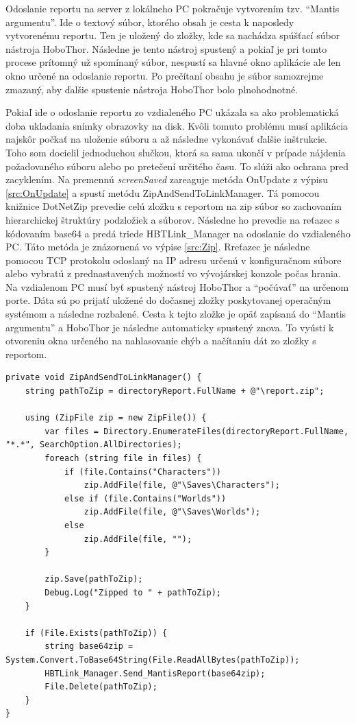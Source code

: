 \documentclass[slovak, bachelorpractice]{diploma}
\begin{document}
Odoslanie reportu na server z lokálneho PC pokračuje vytvorením tzv. \enquote{Mantis argumentu}. Ide o textový súbor, ktorého obsah je cesta k naposledy vytvorenému reportu. Ten je uložený do zložky, kde sa nachádza spúšťací súbor nástroja HoboThor. Následne je tento nástroj spustený a pokiaľ je pri tomto procese  prítomný už spomínaný súbor, nespustí sa hlavné okno aplikácie ale len okno určené na odoslanie reportu. Po prečítaní obsahu je súbor samozrejme zmazaný, aby ďalšie spustenie nástroja HoboThor bolo plnohodnotné.

Pokiaľ ide o odoslanie reportu zo vzdialeného PC ukázala sa ako problematická doba ukladania snímky obrazovky na disk. Kvôli tomuto problému musí aplikácia najskôr počkať na uloženie súboru a až následne vykonávať ďalšie inštrukcie. Toho som docielil jednoduchou slučkou, ktorá sa sama ukončí v prípade nájdenia požadovaného súboru alebo po pretečení určitého času. To slúži ako ochrana pred zacyklením. Na premennú \textit{screenSaved} zareaguje metóda OnUpdate z výpisu \ref{src:OnUpdate} a spustí metódu ZipAndSendToLinkManager. Tá pomocou knižnice DotNetZip \cite{DotNetZip} prevedie celú zložku s reportom na zip súbor so zachovaním hierarchickej štruktúry podzložiek a súborov. Následne ho prevedie na reťazec s kódovaním base64 a predá triede HBTLink\_Manager na odoslanie do vzdialeného PC. Táto metóda je znázornená vo výpise \ref{src:Zip}. Rreťazec je následne pomocou TCP protokolu odoslaný na IP adresu určenú v konfiguračnom súbore alebo vybratú z prednastavených možností vo vývojárskej konzole počas hrania. Na vzdialenom PC musí byť spustený nástroj HoboThor a \enquote{počúvať} na určenom porte. Dáta sú po prijatí uložené do dočasnej zložky poskytovanej operačným systémom a následne rozbalené. Cesta k tejto zložke je opäť zapísaná do \enquote{Mantis argumentu} a HoboThor je následne automaticky spustený znova. To vyústi k otvoreniu okna určeného na nahlasovanie chýb a načítaniu dát zo zložky s reportom.
\vspace{20pt}
\begin{lstlisting}[label=src:Zip,caption={Metóda ZipAndSendToLinkManager triedy ReportingManager}]
private void ZipAndSendToLinkManager() {
    string pathToZip = directoryReport.FullName + @"\report.zip";

    using (ZipFile zip = new ZipFile()) {
        var files = Directory.EnumerateFiles(directoryReport.FullName, "*.*", SearchOption.AllDirectories);
        foreach (string file in files) {
            if (file.Contains("Characters"))
                zip.AddFile(file, @"\Saves\Characters");
            else if (file.Contains("Worlds"))
                zip.AddFile(file, @"\Saves\Worlds");
            else
                zip.AddFile(file, "");
        }

        zip.Save(pathToZip);
        Debug.Log("Zipped to " + pathToZip);
    }

    if (File.Exists(pathToZip)) {
        string base64zip = System.Convert.ToBase64String(File.ReadAllBytes(pathToZip));
        HBTLink_Manager.Send_MantisReport(base64zip);
        File.Delete(pathToZip);
    }
}
\end{lstlisting}
\end{document}
